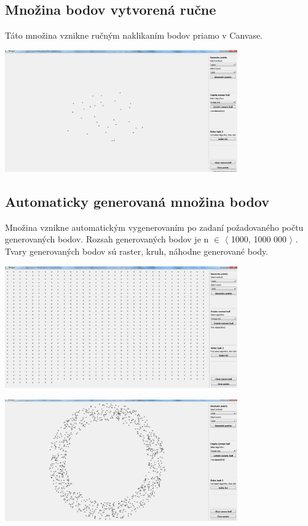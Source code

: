 \documentclass[12pt]{article}
\begin{document}
\subsection{Množina bodov vytvorená ručne}
Táto množina vznikne ručným naklikaním bodov priamo v Canvase.

\begin{center}
   \includegraphics[width=10cm]{./img/points_manual.png}
\end{center}


\subsection{Automaticky generovaná množina bodov}
Množina vznikne automatickým vygenerovaním po zadaní požadovaného počtu generovaných bodov. Rozsah generovaných bodov je  n $\in$ $\langle$ 1000, 1000 000 $\rangle$ . Tvary generovaných bodov sú raster, kruh, náhodne generované body.

\begin{center}
   \includegraphics[width=10cm]{./img/points_generate_grid_1000.png}
\end{center}

\begin{center}
   \includegraphics[width=10cm]{./img/points_generate_circle_1000.png}
\end{center}
\end{document}
